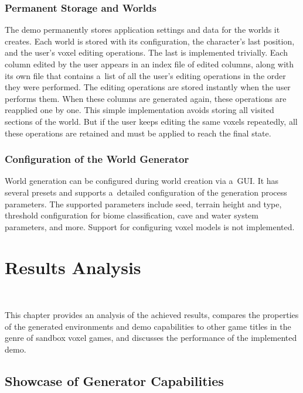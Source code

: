 \subsection{Permanent Storage and Worlds}

The demo permanently stores application settings and data for the worlds it creates. Each world is stored with its configuration, the character's last position, and the user's voxel editing operations. The last is implemented trivially. Each column edited by the user appears in an index file of edited columns, along with its own file that contains a~list of all the user's editing operations in the order they were performed. The editing operations are stored instantly when the user performs them. When these columns are generated again, these operations are reapplied one by one. This simple implementation avoids storing all visited sections of the world. But if the user keeps editing the same voxels repeatedly, all these operations are retained and must be applied to reach the final state.

\subsection{Configuration of the World Generator}

World generation can be configured during world creation via a~GUI. It has several presets and supports a~detailed configuration of the generation process parameters. The supported parameters include seed, terrain height and type, threshold configuration for biome classification, cave and water system parameters, and more. Support for configuring voxel models is not implemented.


\chapter{Results Analysis}~\label{testing-showcase}

This chapter provides an analysis of the achieved results, compares the properties of the generated environments and demo capabilities to other game titles in the genre of sandbox voxel games, and discusses the performance of the implemented demo.

\section{Showcase of Generator Capabilities}

